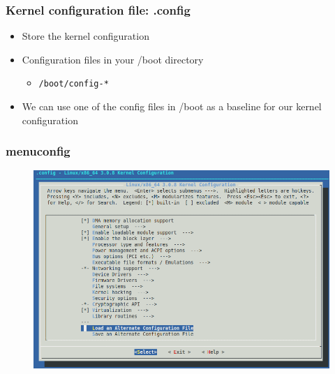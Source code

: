 \documentclass{beamer}
\begin{document}

\begin{frame}
\frametitle{Kernel configuration file: .config}

  \begin{itemize}
 	\item Store the kernel configuration
 	\item Configuration files in your /boot directory
           \begin{itemize}
 	   \item \texttt{/boot/config-*}
           \end{itemize}
 	\item We can use one of the config files in /boot as a baseline for our kernel configuration
 \end{itemize}


\end{frame}


\begin{frame}
\frametitle{menuconfig}
 
\begin{figure}
  \centering
	\includegraphics[scale=0.3,clip=true]{figs/menuconfig.png}
  \label{fig:menuconfig}
\end{figure}

\end{frame}


\end{document}
